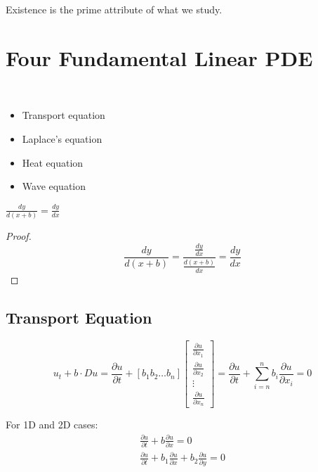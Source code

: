 \documentclass{blog}
\begin{document}
Existence is the prime attribute of what we study.

\section{Four Fundamental Linear PDE}
\begin{definition}~
    \begin{itemize}
        \item Transport equation
        \item Laplace's equation
        \item Heat equation
        \item Wave equation
    \end{itemize}
\end{definition}

\begin{lemma}
    $\frac{dy}{d(x+b)} = \frac{dy}{dx}$
\end{lemma}

\begin{proof}
    \begin{equation*}
        \frac{dy}{d(x+b)} = \frac{\frac{dy}{dx}}{\frac{d(x+b)}{dx}} = \frac{dy}{dx}
    \end{equation*}
\end{proof}

\subsection{Transport Equation}
\begin{definition}
    \begin{equation}
        \label{equ:transport-equation}
        u_{t} + b \cdot Du =
        \frac{\partial u}{\partial t} +
        [b_{1} b_{2} \dots b_{n}]
        \begin{bmatrix}
            \frac{\partial u}{\partial x_{1}} \\
            \frac{\partial u}{\partial x_{2}} \\
            \vdots                            \\
            \frac{\partial u}{\partial x_{n}}
        \end{bmatrix}
        = \frac{\partial u}{\partial t} + \sum_{i=n}^{n}b_{i}\frac{\partial u}{\partial x_{i}} = 0
    \end{equation}
\end{definition}

\begin{example}
    For 1D and 2D cases:
    \begin{gather*}
        \frac{\partial u}{\partial t} + b \frac{\partial u}{\partial x} = 0 \\
        \frac{\partial u}{\partial t} + b_{1} \frac{\partial u}{\partial x} + b_{2} \frac{\partial u}{\partial y} = 0
    \end{gather*}
\end{example}
\end{document}
